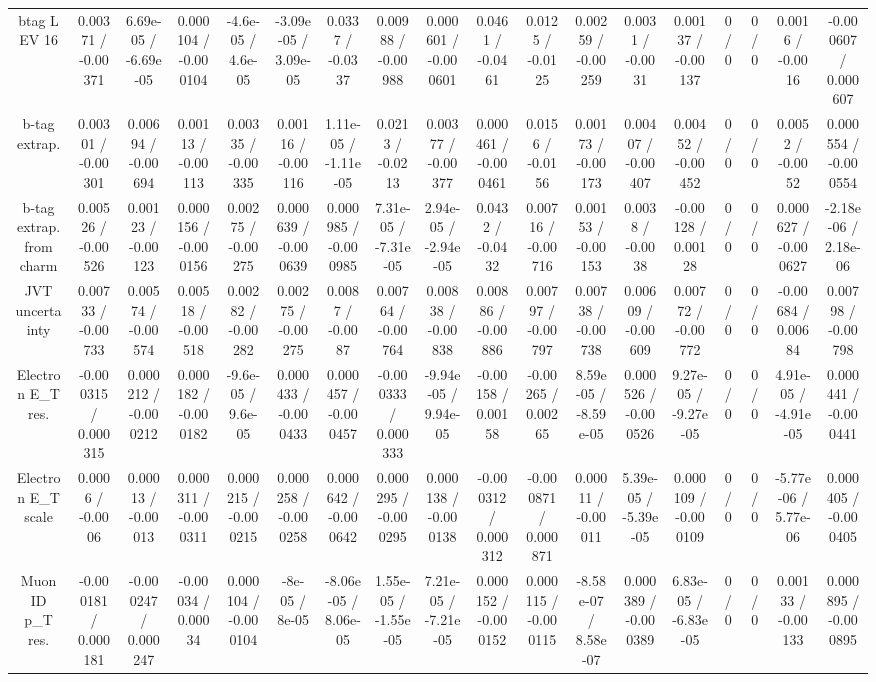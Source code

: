 \documentclass[10pt]{article}
\begin{document}
\begin{table}[htbp]
\begin{center}
\begin{tabular}{|c|c|c|c|c|c|c|c|c|c|c|c|c|c|c|c|c|c|}
  btag L EV 16 & 0.00371 / -0.00371 & 6.69e-05 / -6.69e-05 & 0.000104 / -0.000104 & -4.6e-05 / 4.6e-05 & -3.09e-05 / 3.09e-05 & 0.0337 / -0.0337 & 0.00988 / -0.00988 & 0.000601 / -0.000601 & 0.0461 / -0.0461 & 0.0125 / -0.0125 & 0.00259 / -0.00259 & 0.0031 / -0.0031 & 0.00137 / -0.00137 & 0 / 0 & 0 / 0 & 0.0016 / -0.0016 & -0.000607 / 0.000607 \\ 
  b-tag extrap. & 0.00301 / -0.00301 & 0.00694 / -0.00694 & 0.00113 / -0.00113 & 0.00335 / -0.00335 & 0.00116 / -0.00116 & 1.11e-05 / -1.11e-05 & 0.0213 / -0.0213 & 0.00377 / -0.00377 & 0.000461 / -0.000461 & 0.0156 / -0.0156 & 0.00173 / -0.00173 & 0.00407 / -0.00407 & 0.00452 / -0.00452 & 0 / 0 & 0 / 0 & 0.0052 / -0.0052 & 0.000554 / -0.000554 \\ 
  b-tag extrap. from charm & 0.00526 / -0.00526 & 0.00123 / -0.00123 & 0.000156 / -0.000156 & 0.00275 / -0.00275 & 0.000639 / -0.000639 & 0.000985 / -0.000985 & 7.31e-05 / -7.31e-05 & 2.94e-05 / -2.94e-05 & 0.0432 / -0.0432 & 0.00716 / -0.00716 & 0.00153 / -0.00153 & 0.0038 / -0.0038 & -0.00128 / 0.00128 & 0 / 0 & 0 / 0 & 0.000627 / -0.000627 & -2.18e-06 / 2.18e-06 \\ 
  JVT uncertainty & 0.00733 / -0.00733 & 0.00574 / -0.00574 & 0.00518 / -0.00518 & 0.00282 / -0.00282 & 0.00275 / -0.00275 & 0.0087 / -0.0087 & 0.00764 / -0.00764 & 0.00838 / -0.00838 & 0.00886 / -0.00886 & 0.00797 / -0.00797 & 0.00738 / -0.00738 & 0.00609 / -0.00609 & 0.00772 / -0.00772 & 0 / 0 & 0 / 0 & -0.00684 / 0.00684 & 0.00798 / -0.00798 \\ 
  Electron E_{T} res. & -0.000315 / 0.000315 & 0.000212 / -0.000212 & 0.000182 / -0.000182 & -9.6e-05 / 9.6e-05 & 0.000433 / -0.000433 & 0.000457 / -0.000457 & -0.000333 / 0.000333 & -9.94e-05 / 9.94e-05 & -0.00158 / 0.00158 & -0.00265 / 0.00265 & 8.59e-05 / -8.59e-05 & 0.000526 / -0.000526 & 9.27e-05 / -9.27e-05 & 0 / 0 & 0 / 0 & 4.91e-05 / -4.91e-05 & 0.000441 / -0.000441 \\ 
  Electron E_{T} scale & 0.0006 / -0.0006 & 0.00013 / -0.00013 & 0.000311 / -0.000311 & 0.000215 / -0.000215 & 0.000258 / -0.000258 & 0.000642 / -0.000642 & 0.000295 / -0.000295 & 0.000138 / -0.000138 & -0.000312 / 0.000312 & -0.000871 / 0.000871 & 0.00011 / -0.00011 & 5.39e-05 / -5.39e-05 & 0.000109 / -0.000109 & 0 / 0 & 0 / 0 & -5.77e-06 / 5.77e-06 & 0.000405 / -0.000405 \\ 
  Muon ID p_{T} res. & -0.000181 / 0.000181 & -0.000247 / 0.000247 & -0.00034 / 0.00034 & 0.000104 / -0.000104 & -8e-05 / 8e-05 & -8.06e-05 / 8.06e-05 & 1.55e-05 / -1.55e-05 & 7.21e-05 / -7.21e-05 & 0.000152 / -0.000152 & 0.000115 / -0.000115 & -8.58e-07 / 8.58e-07 & 0.000389 / -0.000389 & 6.83e-05 / -6.83e-05 & 0 / 0 & 0 / 0 & 0.00133 / -0.00133 & 0.000895 / -0.000895 \\ 

\end{tabular}
\end{center}
\end{table}
\end{document}

